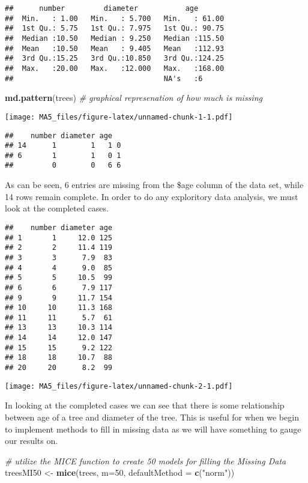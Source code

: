 \documentclass[]{article}
\newenvironment{Shaded}{\begin{snugshade}}{\end{snugshade}}
\newcommand{\KeywordTok}[1]{\textcolor[rgb]{0.13,0.29,0.53}{\textbf{#1}}}
\newcommand{\DataTypeTok}[1]{\textcolor[rgb]{0.13,0.29,0.53}{#1}}
\newcommand{\DecValTok}[1]{\textcolor[rgb]{0.00,0.00,0.81}{#1}}
\newcommand{\StringTok}[1]{\textcolor[rgb]{0.31,0.60,0.02}{#1}}
\newcommand{\CommentTok}[1]{\textcolor[rgb]{0.56,0.35,0.01}{\textit{#1}}}
\newcommand{\NormalTok}[1]{#1}
\begin{document}
\begin{verbatim}
##      number         diameter           age        
##  Min.   : 1.00   Min.   : 5.700   Min.   : 61.00  
##  1st Qu.: 5.75   1st Qu.: 7.975   1st Qu.: 90.75  
##  Median :10.50   Median : 9.250   Median :115.50  
##  Mean   :10.50   Mean   : 9.405   Mean   :112.93  
##  3rd Qu.:15.25   3rd Qu.:10.850   3rd Qu.:124.25  
##  Max.   :20.00   Max.   :12.000   Max.   :168.00  
##                                   NA's   :6
\end{verbatim}

\begin{Shaded}
\begin{Highlighting}[]
\KeywordTok{md.pattern}\NormalTok{(trees)                        }\CommentTok{# graphical represenation of how much is missing }
\end{Highlighting}
\end{Shaded}

\texttt{[image: MA5\_files/figure-latex/unnamed-chunk-1-1.pdf]}

\begin{verbatim}
##    number diameter age  
## 14      1        1   1 0
## 6       1        1   0 1
##         0        0   6 6
\end{verbatim}

As can be seen, 6 entries are missing from the \$age column of the data
set, while 14 rows remain complete. In order to do any exploritory data
analysis, we must look at the completed cases.

\begin{verbatim}
##    number diameter age
## 1       1     12.0 125
## 2       2     11.4 119
## 3       3      7.9  83
## 4       4      9.0  85
## 5       5     10.5  99
## 6       6      7.9 117
## 9       9     11.7 154
## 10     10     11.3 168
## 11     11      5.7  61
## 13     13     10.3 114
## 14     14     12.0 147
## 15     15      9.2 122
## 18     18     10.7  88
## 20     20      8.2  99
\end{verbatim}

\texttt{[image: MA5\_files/figure-latex/unnamed-chunk-2-1.pdf]}

In looking at the completed cases we can see that there is some
relationship between age of a tree and diameter of the tree. This is
useful for when we begin to implement methods to fill in missing data as
we will have something to gauge our results on.

\begin{Shaded}
\begin{Highlighting}[]
\CommentTok{# utilize the MICE function to create 50 models for filling the Missing Data }
\NormalTok{treesMI50 <-}\StringTok{ }\KeywordTok{mice}\NormalTok{(trees, }\DataTypeTok{m=}\DecValTok{50}\NormalTok{, }\DataTypeTok{defaultMethod =} \KeywordTok{c}\NormalTok{(}\StringTok{"norm"}\NormalTok{))}
\end{Highlighting}
\end{Shaded}
\end{document}

